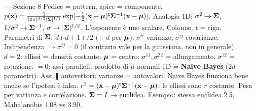 \begin{appunti}{— Sezione 8}
 Pedice = pattern, apice = componente. $p(\mathbf{x})=\frac{1}{(2\pi)^{d/2}|\bm{\Sigma}|^{1/2}}\exp[-\frac12(\mathbf{x}-\bm{\mu})^{\mathsf{t}}\bm{\Sigma}^{-1}(\mathbf{x}-\bm{\mu})]$. Analogia 1D: $\sigma^2\to\bm{\Sigma}$, $1/\sigma^2\to\bm{\Sigma}^{-1}$, $\sigma\to|\bm{\Sigma}|^{1/2}$. L'esponente è uno scalare.
 Colonne, $\mathsf{t}$ = riga. Parametri di $\bm{\Sigma}$: $d(d+1)/2$ (+ $d$ per $\bm{\mu}$). $\sigma^{ii}$ varianze; $\sigma^{ij}$ covarianze. Indipendenza $\Rightarrow\sigma^{ij}=0$ (il contrario vale per la gaussiana, non in generale).
 $d=2$: ellissi = densità costante. $\bm{\mu}$ = centro; $\sigma^{11},\sigma^{22}$ = allungamento.
 $\sigma^{12}$ = rotazione. $=0$: assi paralleli, prodotto di $d$ normali 1D = \textbf{Naive Bayes} ($2d$ parametri). Assi ∥ autovettori; varianze = autovalori. Naive Bayes funziona bene anche se l'ipotesi è falsa.
 $r^2=(\mathbf{x}-\bm{\mu})^{\mathsf{t}}\bm{\Sigma}^{-1}(\mathbf{x}-\bm{\mu})$: le ellissi sono $r$ costante. Pesa per varianza e correlazione. $\bm{\Sigma}=I$ → euclidea. Esempio: stessa euclidea 2.5, Mahalanobis 1.08 vs 3.90.
\end{appunti}

